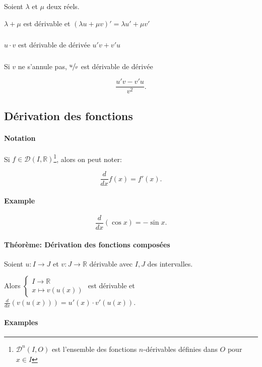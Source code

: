 \documentclass{article}
\newcommand{\R}{\mathbb{R}}
\begin{document}
\subsubsection{}
Soient $\lambda$ et $\mu$ deux réels.

$\lambda + \mu$  est dérivable et $(\lambda u + \mu v)' = \lambda u' + \mu v'$

\subsubsection{}
$u\cdot v$ est dérivable de dérivée $u'v+v'u$

\subsubsection{}
Si $v$ ne s'annule pas, $\sfrac{u}{v}$ est dérivable de dérivée 

\[
	\frac{u'v-v'u}{v^2}
.\] 

\subsection{Dérivation des fonctions}
\paragraph{Notation}
Si $f \in \mathcal{D}(I, \R)$\footnote{$\mathcal{D}^n(I, O)$ est l'ensemble des fonctions $n$-dérivables définies dans $O$ pour $x \in I$}, alors on peut noter:

\[
	\frac{d}{dx}f(x) = f'(x)
.\] 

\paragraph{Example}
\[
	\frac{d}{dx}\left( \cos x \right) = -\sin x
.\] 

\paragraph{Théorème: Dérivation des fonctions composées}
Soient $u: I\to J$ et $v:J\to \R$ dérivable avec $I, J$ des intervalles.

Alors $\begin{cases}
	I\to \R \\
	x\mapsto v(u(x))
\end{cases}$ est dérivable et $ \frac{d}{dx}\left( v(u(x)) \right) = u'(x)\cdot v'(u(x))$.

\paragraph{Examples}
\end{document}
